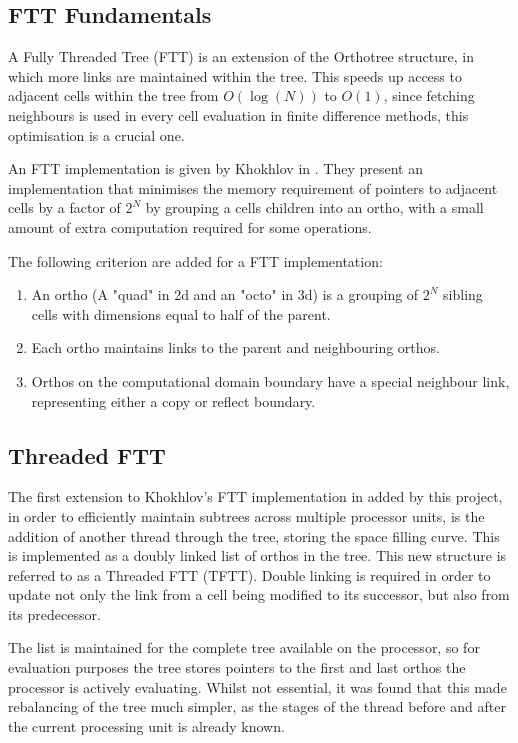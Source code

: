 \documentclass[12pt]{article}
\begin{document}
\subsection{FTT Fundamentals}
A Fully Threaded Tree (FTT) is an extension of the Orthotree structure, in which more links are maintained within the tree. This speeds up access to adjacent cells within the tree from $O(\log(N))$ to $O(1)$, since fetching neighbours is used in every cell evaluation in finite difference methods, this optimisation is a crucial one. 

An FTT implementation is given by Khokhlov in \cite{Khokhlov98}. They present an implementation that minimises the memory requirement of pointers to adjacent cells by a factor of $2^N$ by grouping a cells children into an ortho, with a small amount of extra computation required for some operations. 

The following criterion are added for a FTT implementation:
\begin{enumerate}
	\item An ortho (A "quad" in 2d and an "octo" in 3d) is a grouping of $2^N$ sibling cells with dimensions equal to half of the parent.
	\item Each ortho maintains links to the parent and neighbouring orthos.
	\item Orthos on the computational domain boundary have a special neighbour link, representing either a copy or reflect boundary.
\end{enumerate}

\subsection{Threaded FTT}
The first extension to Khokhlov's FTT implementation in \cite{Khokhlov98} added by this project, in order to efficiently maintain subtrees across multiple processor units, is the addition of another thread through the tree, storing the space filling curve. This is implemented as a doubly linked list of orthos in the tree. This new structure is referred to as a Threaded FTT (TFTT). Double linking is required in order to update not only the link from a cell being modified to its successor, but also from its predecessor. 

The list is maintained for the complete tree available on the processor, so for evaluation purposes the tree stores pointers to the first and last orthos the processor is actively evaluating. Whilst not essential, it was found that this made rebalancing of the tree much simpler, as the stages of the thread before and after the current processing unit is already known.
\end{document}
